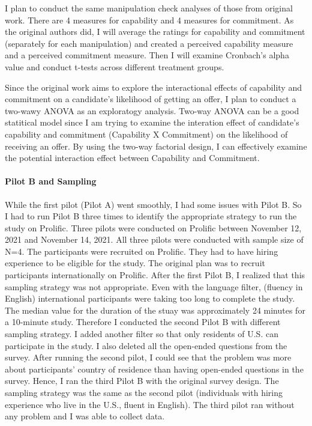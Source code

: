\documentclass[]{article}
\let\oldparagraph\paragraph
\renewcommand{\paragraph}[1]{\oldparagraph{#1}\mbox{}}
\begin{document}
I plan to conduct the same manipulation check analyses of those from
original work. There are 4 measures for capability and 4 measures for
commitment. As the original authors did, I will average the ratings for
capability and commitment (separately for each manipulation) and created
a perceived capability measure and a perceived commitment measure. Then
I will examine Cronbach's alpha value and conduct t-tests across
different treatment groups.

Since the original work aims to explore the interactional effects of
capability and commitment on a candidate's likelihood of getting an
offer, I plan to conduct a two-wawy ANOVA as an exploratogy analysis.
Two-way ANOVA can be a good statitical model since I am trying to
examine the interation effect of candidate's capability and commitment
(Capability X Commitment) on the likelihood of receiving an offer. By
using the two-way factorial design, I can effectively examine the
potential interaction effect between Capability and Commitment.

\hypertarget{pilot-b-and-sampling}{%
\paragraph{Pilot B and Sampling}\label{pilot-b-and-sampling}}

While the first pilot (Pilot A) went smoothly, I had some issues with
Pilot B. So I had to run Pilot B three times to identify the appropriate
strategy to run the study on Prolific. Three pilots were conducted on
Prolific between November 12, 2021 and November 14, 2021. All three
pilots were conducted with sample size of N=4. The participants were
recruited on Prolific. They had to have hiring experience to be eligible
for the study. The original plan was to recruit participants
internationally on Prolific. After the first Pilot B, I realized that
this sampling strategy was not appropriate. Even with the language
filter, (fluency in English) international participants were taking too
long to complete the study. The median value for the duration of the
stuay was approximately 24 minutes for a 10-minute study. Therefore I
conducted the second Pilot B with different sampling strategy. I added
another filter so that only residents of U.S. can participate in the
study. I also deleted all the open-ended questions from the survey.
After running the second pilot, I could see that the problem was more
about participants' country of residence than having open-ended
questions in the survey. Hence, I ran the third Pilot B with the
original survey design. The sampling strategy was the same as the second
pilot (individuals with hiring experience who live in the U.S., fluent
in English). The third pilot ran without any problem and I was able to
collect data.\\
\end{document}
